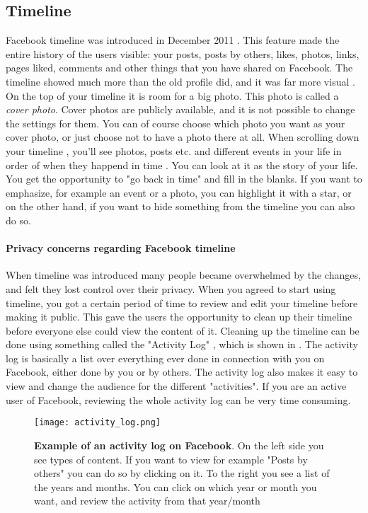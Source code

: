 \subsection{Timeline}
\label{timeline}
Facebook timeline was introduced in December 2011 \cite{EvolutionOfFacebook}. This feature made the entire history of the users visible: your posts, posts by others, likes, photos, links, pages liked, comments and other things that you have shared on Facebook. The timeline showed much more than the old profile did, and it was far more visual \cite{timeline}. On the top of your timeline it is room for a big photo. This photo is called a \emph{cover photo}. Cover photos are publicly available, and it is not possible to change the settings for them. You can of course choose which photo you want as your cover photo, or just choose not to have a photo there at all. When scrolling down your timeline , you'll see photos, posts etc. and different events in your life in order of when they happend in time \cite{timeline}. You can look at it as the story of your life. You get the opportunity to "go back in time" and fill in the blanks. If you want to emphasize, for example an event or a photo, you can highlight it with a star, or on the other hand, if you want to hide something from the timeline you can also do so. 

\paragraph{Privacy concerns regarding Facebook timeline}
When timeline was introduced many people became overwhelmed by the changes, and felt they lost control over their privacy. When you agreed to start using timeline, you got a certain period of time to review and edit your timeline before making it public. This gave the users the opportunity to clean up their timeline before everyone else could view the content of it. Cleaning up the timeline can be done using something called the "Activity Log" \cite{activitylog}, which is shown in . The activity log is basically a list over everything ever done in connection with you on Facebook, either done by you or by others. The activity log also makes it easy to view and change the audience for the different "activities". If you are an active user of Facebook, reviewing the whole activity log can be very time consuming. 

\begin{figure}[t]
\centering
\texttt{[image: activity\_log.png]}
\caption [Example of an activity log on Facebook.]{\textbf{Example of an activity log on Facebook}. On the left side you see types of content. If you want to view for example "Posts by others" you can do so by clicking on it. To the right you see a list of the years and months. You can click on which year or month you want, and review the activity from that year/month \cite{activitylog}} 
\label{fig:activitylog}
\end{figure}

